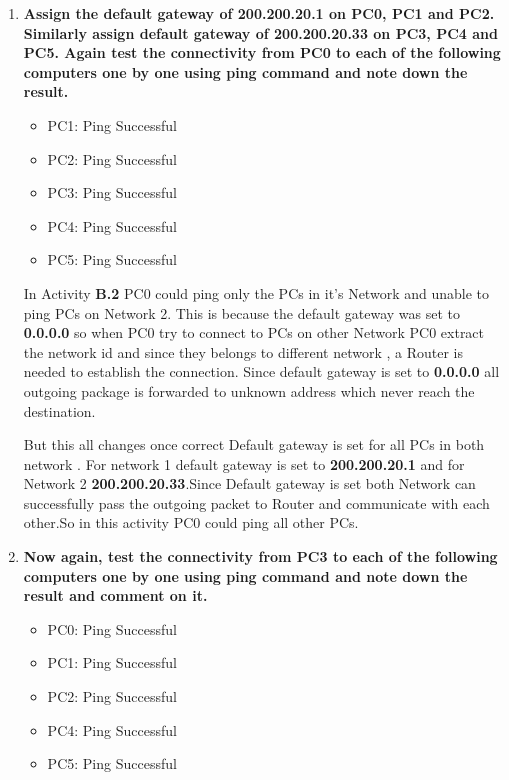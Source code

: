 \documentclass[a4paper,11pt]{article}
\begin{document}
\begin{enumerate}

      \item \textbf{Assign the default gateway of 200.200.20.1 on PC0, PC1 and PC2. Similarly assign default gateway of 200.200.20.33 on PC3, PC4 and PC5. Again test the connectivity from PC0 to each of the following computers one by one using ping command and note down the result.}
            \begin{itemize}
                  \item PC1: Ping Successful
                  \item PC2: Ping Successful\\
                  \item PC3: Ping Successful
                  \item PC4: Ping Successful
                  \item PC5: Ping Successful
            \end{itemize}

            In Activity \textbf{B.2} PC0 could ping only the PCs in it's Network and unable to ping PCs on Network 2. This is because the default gateway was set to \textbf{0.0.0.0} so when PC0 try to connect to PCs on other Network PC0 extract the network id and since they belongs to different network , a Router is needed to establish the connection.
            Since default gateway is set to \textbf{0.0.0.0} all outgoing package is forwarded to unknown address which never reach the destination.

            But this all changes once correct Default gateway is set for all PCs in both network . For network 1 default gateway is set to \textbf{200.200.20.1} and for Network 2 \textbf{200.200.20.33}.Since Default gateway is set  both Network can successfully pass the outgoing packet to Router and communicate with each other.So in this activity PC0 could ping all other PCs.


      \item \textbf{Now again, test the connectivity from PC3 to each of the following computers one by one using ping command and note down the result and comment on it.}
            \begin{itemize}
                  \item PC0: Ping Successful
                  \item PC1: Ping Successful
                  \item PC2: Ping Successful\\
                  \item PC4: Ping Successful
                  \item PC5: Ping Successful
            \end{itemize}



\end{enumerate}
\end{document}
